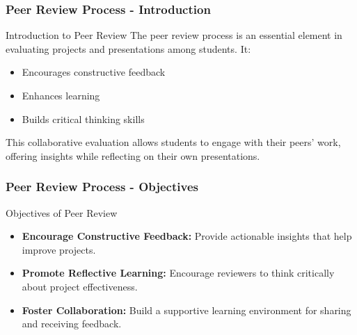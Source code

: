\documentclass[aspectratio=169]{beamer}
\begin{document}
\begin{frame}[fragile]
    \frametitle{Peer Review Process - Introduction}
    \begin{block}{Introduction to Peer Review}
        The peer review process is an essential element in evaluating projects and presentations among students. It:
        \begin{itemize}
            \item Encourages constructive feedback
            \item Enhances learning
            \item Builds critical thinking skills
        \end{itemize}
        This collaborative evaluation allows students to engage with their peers' work, offering insights while reflecting on their own presentations.
    \end{block}
\end{frame}

\begin{frame}[fragile]
    \frametitle{Peer Review Process - Objectives}
    \begin{block}{Objectives of Peer Review}
        \begin{itemize}
            \item \textbf{Encourage Constructive Feedback:} Provide actionable insights that help improve projects.
            \item \textbf{Promote Reflective Learning:} Encourage reviewers to think critically about project effectiveness.
            \item \textbf{Foster Collaboration:} Build a supportive learning environment for sharing and receiving feedback.
        \end{itemize}
    \end{block}
\end{frame}
\end{document}
